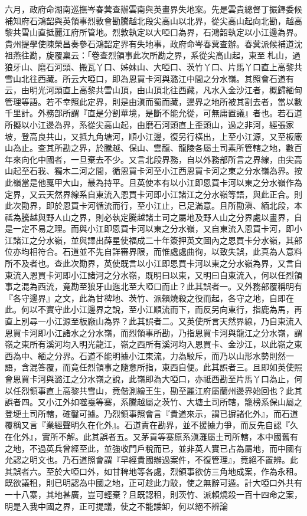 \begin{pinyinscope}
六月，政府命湖南巡撫岑春蓂查辦雲南與英畫界失地案。先是雲貴總督丁振鐸委候補知府石鴻韶與英領事烈敦會勘騰越北段尖高山以北界，從尖高山起向北勘，越高黎共雪山直抵麗江府所管地。烈敦執定以大啞口為界，石鴻韶執定以小江邊為界。貴州提學使陳榮昌奏參石鴻韶定界有失地事，政府命岑春蓂查辦。春蓂派候補道沈祖燕往勘，旋覆稟云：「卷查烈領事此次所勘之界，系從尖高山起，東至札山，過狼牙山、磨石河頭、搬瓦丫口、姊妹山、大啞口、茨竹丫口、片馬丫口直上高黎共雪山北往西藏。所云大啞口，即為恩買卡河與潞江中間之分水嶺。其照會石道有云，由明光河頭直上高黎共雪山頂，由山頂北往西藏，凡水入金沙江者，概歸緬甸管理等語。若不幸照此定界，則是由滇而蜀而藏，邊界之地所被其割去者，當以數千里計。外務部所謂『直是分割華境，是斷不能允從，可無庸置議』者也。若石道所擬以小江邊為界，系從尖高山起，由磨石河頭直上歪頭山，過之非河，經張家坡，登高良共山，又抵九角塘河，順小江邊，復另行橫出，上至小江源，又至板廠山為止。查其所勘之界，於騰越、保山、雲龍、龍陵各屬土司素所管轄之地，數百年來向化中國者，一旦棄去不少。又言北段界務，自以外務部所言之界線，由尖高山起至石我、獨木二河之間，循恩買卡河至小江西恩買卡河之東之分水嶺為界。按此嶺當是他戛甲大山，最為持平。且英使本有以小江即恩買卡河以東之分水嶺作為定界，又云天然界線系自東流入恩買卡河即小江諸江之分水嶺等語，與此正合。則此次勘界，即於恩買卡河循流而行，至小江止，已足滿意。且所勘滇、緬北段，本祗為騰越與野人山之界，則必執定騰越諸土司之屬地及野人山之分界處以畫界，自是一定不易之理。而與小江即恩買卡河以東之分水嶺，又自東流入恩買卡河，即小江諸江之分水嶺，並與譯出薛星使福成二十年簽押英文圖內之恩買卡分水嶺，其部位亦均相符合。石道並不先自詳審界限，而惟處處曲徇，以致失誤，此真為人意料所不及者也。查此次勘界，英使既言以小江即恩買卡河以東之分水嶺為界，又言自東流入恩買卡河即小江諸河之分水嶺，既明曰以東，又明曰自東流入，何以任烈領事之混為西流，竟勘至狼牙山迤北至大啞口而止？此其誤者一。又外務部覆稱明有『各守邊界』之文，此為甘稗地、茨竹、派賴燒殺之役而起，各守之地，自即在此。何以不實守此小江邊界之說，至小江順流而下，而反另向東行，指鹿為馬，再直上別尋一小江源至板廠山為界？此其誤者二。又英使所言天然界線，乃自東流入恩買卡河即小江諸水之分水嶺，而烈領事所勘，乃指恩買卡河與龍江之分水嶺，謂嶺之東所有溪河均入明光龍江，嶺之西所有溪河均入恩買卡、金沙江，以此嶺之東西為中、緬之分界。石道不能明據小江東流，力為駮斥，而乃以山形水勢則然一語，含混答覆，而竟任烈領事之隨意所指，東西自便。此其誤者三。且即如英使照會恩買卡河與潞江之分水嶺之說，此嶺即為大啞口，亦祗西勘至片馬丫口為止，何以任烈領事直上高黎共雪山，竟偕測繪王生，勘至麗江府屬蘭州邊界始回也？此其誤者四。又小江外如噬戛等寨，系騰越屬之茨竹、大塘土司所轄，籠榜系保山屬之登埂土司所轄，確鑿可據。乃烈領事照會言『貴道來示，謂已摒諸化外』，而石道覆稱又言『業經聲明久在化外』。石道責在勘界，並不援據力爭，而反先自認『久在化外』，實所不解。此其誤者五。又茅貢等寨原系滇灘屬土司所轄，本中國舊有之地，不過英兵曾經至此，並強收門戶稅而已，並非英人實已占為屬地，而中國有允認之明文也。乃石道照會謂『早經貴國辦過案件，不復管理』，竟絕不置辨。此其誤者六。至於大啞口外，如甘稗地等各處，烈領事欲仿三角地成案，作為永租。既欲議租，則已明認為中國之地，正可趁此力駮，使之無辭可遁。計大啞口外共有一十八寨，其地甚廣，豈可輕棄？且既認租，則茨竹、派賴燒殺一百十四命之案，明是入我中國之界，正可提議，使之不能諉卸，何以絕不辨論
\end{pinyinscope}
